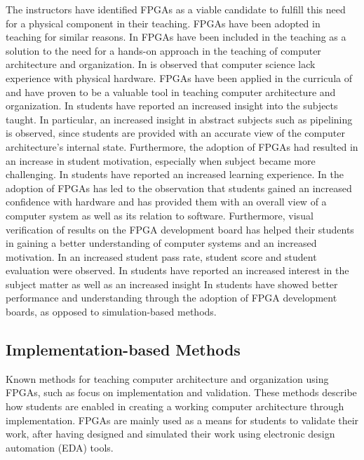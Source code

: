 \documentclass[openright]{template/uva-bachelor-thesis}
\begin{document}
The instructors have identified FPGAs as a viable candidate to fulfill this need for a physical component in their teaching. FPGAs have been adopted in teaching for similar reasons. 
In \cite{cifredo2015computer, oztekin2011bzk} FPGAs have been included in the teaching as a solution to the need for a hands-on approach in the teaching of computer architecture and organization.
In \cite{el2011teaching} is observed that computer science lack experience with physical hardware.
FPGAs have been applied in the curricula of \cite{paharsingh2009novel, jansen2014every, el2011teaching, pereira2012basic, cifredo2015computer, kellett2012project, el2011teaching, pereira2012basic, lee2012pipelined, oztekin2011bzk, bulic2013fpga, el2011teaching, pereira2012basic, lee2012pipelined, oztekin2011bzk, nakano2008processor, al2007teaching} and have proven to be a valuable tool in teaching computer architecture and organization. 
In \cite{bulic2013fpga} students have reported an increased insight into the subjects taught. In particular, an increased insight in abstract subjects such as pipelining is observed, since students are provided with an accurate view of the computer architecture's internal state. Furthermore, the adoption of FPGAs had resulted in an increase in student motivation, especially when subject became more challenging. 
In \cite{oztekin2011bzk} students have reported an increased learning experience. 
In \cite{lee2012pipelined} the adoption of FPGAs has led to the observation that students gained an increased confidence with hardware and has provided them with an overall view of a computer system as well as its relation to software. Furthermore, visual verification of results on the FPGA development board has helped their students in gaining a better understanding of computer systems and an increased motivation.
In \cite{paharsingh2009novel} an increased student pass rate, student score and student evaluation were observed.  
In \cite{cifredo2015computer} students have reported an increased interest in the subject matter as well as an increased insight
In \cite{el2011teaching} students have showed better performance and understanding through the adoption of FPGA development boards, as opposed to simulation-based methods. 


\subsection{Implementation-based Methods}

Known methods for teaching computer architecture and organization using FPGAs, such as \cite{paharsingh2009novel, el2011teaching, nakano2008processor, al2007teaching, kellett2012project, jansen2014every, pereira2012basic, cifredo2015computer, lee2012pipelined} focus on implementation and validation. These methods describe how students are enabled in creating a working computer architecture through implementation. FPGAs are mainly used as a means for students to validate their work, after having designed and simulated their work using electronic design automation (EDA) tools. 
\end{document}
